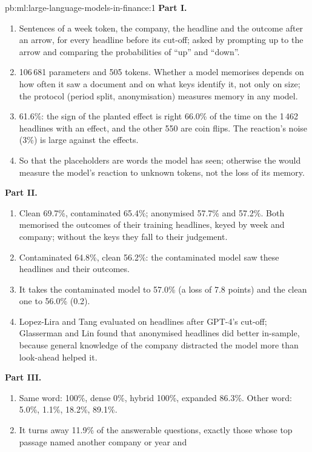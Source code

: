 \begin{solution}{pb:ml:large-language-models-in-finance:1}
\textbf{Part I.}
\begin{enumerate}
\item Sentences of a week token, the company, the headline and the outcome after an arrow, for every headline before its
cut-off; asked by prompting up to the arrow and comparing the probabilities of ``up'' and ``down''.
\item 106\,681 parameters and 505 tokens. Whether a model memorises depends on how often it saw a document and on what keys
identify it, not only on size; the protocol (period split, anonymisation) measures memory in any model.
\item 61.6\%: the sign of the planted effect is right 66.0\% of the time on the 1\,462 headlines with an effect, and the
other 550 are coin flips. The reaction's noise (3\%) is large against the effects.
\item So that the placeholders are words the model has seen; otherwise the  would measure the model's
reaction to unknown tokens, not the loss of its memory.
\end{enumerate}
\textbf{Part II.}
\begin{enumerate}[resume]
\item Clean 69.7\%, contaminated 65.4\%; anonymised 57.7\% and 57.2\%. Both memorised the outcomes of their training
headlines, keyed by week and company; without the keys they fall to their judgement.
\item Contaminated 64.8\%, clean 56.2\%: the contaminated model saw these headlines and their outcomes.
\item It takes the contaminated model to 57.0\% (a loss of 7.8 points) and the clean one to 56.0\% (0.2).
\item Lopez-Lira and Tang evaluated on headlines after GPT-4's cut-off; Glasserman and Lin found that anonymised headlines
did better in-sample, because general knowledge of the company distracted the model more than look-ahead helped it.
\end{enumerate}
\textbf{Part III.}
\begin{enumerate}[resume]
\item Same word:  100\%, dense 0\%, hybrid 100\%, expanded  86.3\%. Other word: 5.0\%, 1.1\%, 18.2\%, 89.1\%.
\item It turns away 11.9\% of the answerable questions, exactly those whose top passage named another company or year and

\end{enumerate}
\end{solution}

